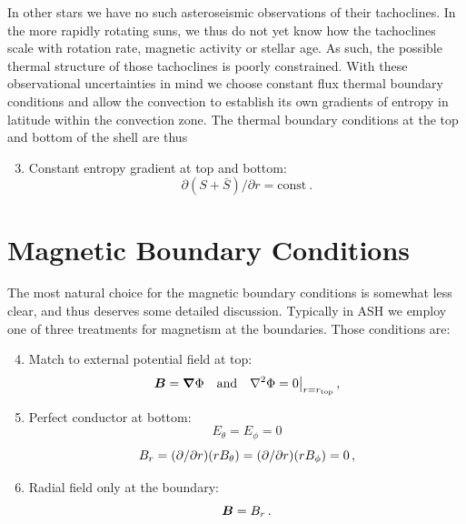 In other stars we have no such asteroseismic observations of their tachoclines.
In the more rapidly rotating suns, we thus do not yet know how the
tachoclines scale with rotation rate, magnetic activity or stellar
age.  As such, the possible thermal structure of those tachoclines is
poorly constrained.  With these observational uncertainties in mind we choose
constant flux thermal boundary conditions and allow the convection to establish its own
gradients of entropy in latitude within the convection zone.  The thermal boundary
conditions at the top and bottom of the shell are thus
\begin{enumerate}
    \setcounter{enumi}{2}
   \item Constant entropy gradient at top and bottom: 
    \begin{equation}
        \partial (S+ \bar{S})/\partial r = \mathrm{const}\:.
    \end{equation}
\end{enumerate}


\section{Magnetic Boundary Conditions}
The most natural choice for the magnetic boundary conditions is
somewhat less clear, and thus deserves some detailed discussion.  
Typically in ASH we employ one of three treatments for magnetism
at the boundaries.  Those conditions are: 
\begin{enumerate}
    \setcounter{enumi}{3}
   \item Match to external potential field at top:
    \begin{equation}
      \vec{B} = \vec{\nabla} \Phi  \quad \mathrm{and} \quad \nabla^2 \Phi = 0 {\big|}_{r=r_\mathrm{top}}\thinspace,\nonumber
    \end{equation}
  \item Perfect conductor at bottom:
    \begin{equation}
      E_\theta = E_\phi = 0\nonumber
    \end{equation}
    \begin{equation}
      B_r = (\partial/\partial r)(r B_\theta)=(\partial/\partial r)(r B_\phi)=0\thinspace,
    \end{equation}
   \item Radial field only at the boundary:
    \begin{equation}
      \vec{B} = B_r\thinspace. \nonumber
    \end{equation}
\end{enumerate}

